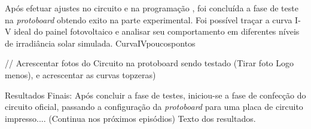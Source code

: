 
Após efetuar ajustes no circuito e na programação , foi concluída a fase de teste na \textit{protoboard} obtendo exito na parte experimental. Foi possível traçar a curva I-V ideal do painel fotovoltaico e analisar seu comportamento em diferentes níveis de irradiância solar simulada.
CurvaIVpoucospontos

// Acrescentar fotos do Circuito na protoboard sendo testado (Tirar foto Logo menos), e acrescentar as curvas topzeras)

Resultados Finais:
Após concluir a fase de testes, iniciou-se a fase de confecção do circuito oficial, passando a configuração da \textit{protoboard} para uma placa de circuito impresso.... (Continua nos próximos episódios)  Texto dos resultados.